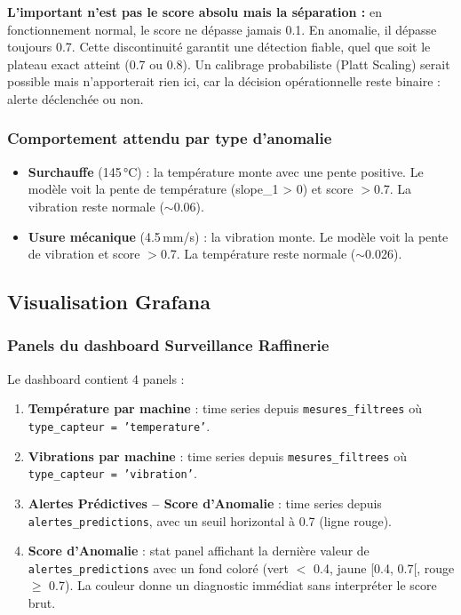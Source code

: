 \documentclass[12pt,a4paper]{article}
\begin{document}
\noindent\textbf{L'important n'est pas le score absolu mais la séparation :} en fonctionnement normal, le score ne dépasse jamais 0.1. En anomalie, il dépasse toujours 0.7. Cette discontinuité garantit une détection fiable, quel que soit le plateau exact atteint (0.7 ou 0.8). Un calibrage probabiliste (Platt Scaling) serait possible mais n'apporterait rien ici, car la décision opérationnelle reste binaire : alerte déclenchée ou non.

\subsubsection{Comportement attendu par type d'anomalie}

\begin{itemize}
    \item \textbf{Surchauffe} (145\,°C) : la température monte avec une pente positive. Le modèle voit la pente de température (slope\_1 > 0) et score $>$0.7. La vibration reste normale ($\sim$0.06).
    \item \textbf{Usure mécanique} (4.5\,mm/s) : la vibration monte. Le modèle voit la pente de vibration et score $>$0.7. La température reste normale ($\sim$0.026).
\end{itemize}

\subsection{Visualisation Grafana}

\subsubsection{Panels du dashboard \og Surveillance Raffinerie \fg}

Le dashboard contient 4 panels :

\begin{enumerate}
    \item \textbf{Température par machine} : time series depuis \texttt{mesures\_filtrees} où \texttt{type\_capteur = 'temperature'}.
    \item \textbf{Vibrations par machine} : time series depuis \texttt{mesures\_filtrees} où \texttt{type\_capteur = 'vibration'}.
    \item \textbf{Alertes Prédictives -- Score d'Anomalie} : time series depuis \texttt{alertes\_predictions}, avec un seuil horizontal à 0.7 (ligne rouge).
    \item \textbf{Score d'Anomalie} : stat panel affichant la dernière valeur de \texttt{alertes\_predictions} avec un fond coloré (vert $<$ 0.4, jaune [0.4, 0.7[, rouge $\geq$ 0.7). La couleur donne un diagnostic immédiat sans interpréter le score brut.
\end{enumerate}
\end{document}
